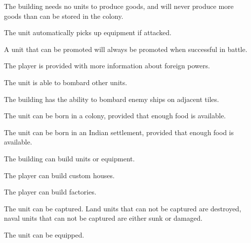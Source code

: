 \documentclass[12pt]{book}
\begin{document}
\affectsBuilding

The building needs no units to produce goods, and will never produce
more goods than can be stored in the colony.

\affectsUnit

The unit automatically picks up equipment if attacked.

\affectsUnit

A unit that can be promoted will always be promoted when successful in
battle.

\affectsPlayer

The player is provided with more information about foreign powers.

\affectsUnit

The unit is able to bombard other units.

\affectsBuilding

The building has the ability to bombard enemy ships on adjacent tiles.

\affectsUnit

The unit can be born in a colony, provided that enough food is available.

\affectsUnit

The unit can be born in an Indian settlement, provided that enough food is available.

\affectsBuilding

The building can build units or equipment.

\affectsPlayer

The player can build custom houses.

\affectsPlayer

The player can build factories.

\affectsUnit

The unit can be captured. Land units that can not be captured are
destroyed, naval units that can not be captured are either sunk or
damaged.

\affectsUnit

The unit can be equipped.
\end{document}
